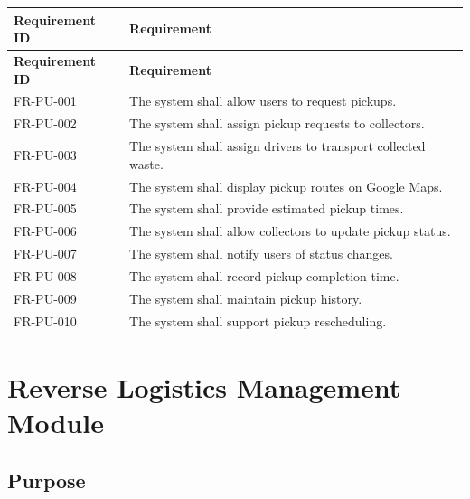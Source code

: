 \begin{longtable}{|p{3cm}|p{10.2cm}|}

\hline
\textbf{Requirement ID} &
\textbf{Requirement}\\
\hline
\endfirsthead

\hline
\textbf{Requirement ID} &
\textbf{Requirement}\\
\hline
\endhead

FR-PU-001 &
The system shall allow users to request pickups.\\
\hline

FR-PU-002 &
The system shall assign pickup requests to collectors.\\
\hline

FR-PU-003 &
The system shall assign drivers to transport collected waste.\\
\hline

FR-PU-004 &
The system shall display pickup routes on Google Maps.\\
\hline

FR-PU-005 &
The system shall provide estimated pickup times.\\
\hline

FR-PU-006 &
The system shall allow collectors to update pickup status.\\
\hline

FR-PU-007 &
The system shall notify users of status changes.\\
\hline

FR-PU-008 &
The system shall record pickup completion time.\\
\hline

FR-PU-009 &
The system shall maintain pickup history.\\
\hline

FR-PU-010 &
The system shall support pickup rescheduling.\\
\hline

\end{longtable}

\section{Reverse Logistics Management Module}
\label{sec:reverse-logistics}

\subsection{Purpose}


